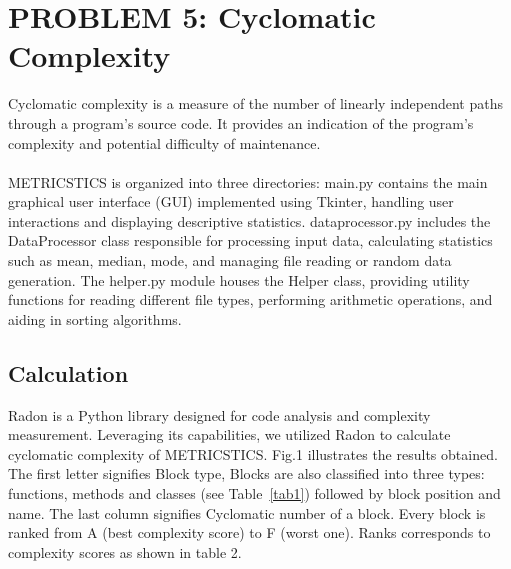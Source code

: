 \documentclass[runningheads]{llncs}
\begin{document}
\section{PROBLEM 5: Cyclomatic Complexity}
Cyclomatic complexity is a measure of the number of linearly independent paths through a program's source code. It provides an indication of the program's complexity and potential difficulty of maintenance.\\
\\
METRICSTICS is organized into three directories: main.py contains the main graphical user interface (GUI) implemented using Tkinter, handling user interactions and displaying descriptive statistics. data\textunderscore processor.py includes the DataProcessor class responsible for processing input data, calculating statistics such as mean, median, mode, and managing file reading or random data generation. The helper.py module houses the Helper class, providing utility functions for reading different file types, performing arithmetic operations, and aiding in sorting algorithms.

\subsection{Calculation}
Radon is a Python library designed for code analysis and complexity measurement. Leveraging its capabilities, we utilized Radon to calculate cyclomatic complexity of METRICSTICS. Fig.1 illustrates the results obtained. The first letter signifies Block type, Blocks are also classified into three types: functions, methods and classes (see Table~\ref{tab1}) followed by block position and name. The last column signifies Cyclomatic number of a block. Every block is ranked from A (best complexity score) to F (worst one). Ranks corresponds to complexity scores as shown in table 2.
\end{document}
